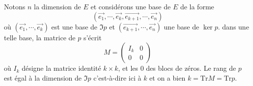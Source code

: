 {\begin{enumerate}
{Notons $n$ la dimension de $E$ et consid\'erons une base de $E$ de la forme
$$(\vec{e_1},\cdots,\vec{e_k},\vec {e_{k+1}},\cdots,\vec{e_n})$$
o\`u $(\vec{e_1},\cdots,\vec{e_k})$ est une base de $\Im p$ et $(\vec {e_{k+1}},\cdots,\vec{e_n})$ une base de $\ker p$.
dans une telle base, la matrice de $p$ s'\'ecrit
$$M=\begin{pmatrix}I_k&0 \\ 0&0\end{pmatrix}$$
o\`u $I_k$ d\'esigne la matrice identit\'e $k\times k$, et les $0$ des blocs de z\'eros. Le rang de $p$ est \'egal \`a la 
dimension de $\Im p$ c'est-\`a-dire ici \`a $k$ et on a bien $k=\mathrm{Tr} M=\mathrm{Tr} p.$}
\end{enumerate}
}
